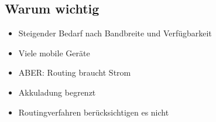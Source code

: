 \documentclass[11pt,landscape]{beamer}
\begin{document}
%
%

\subsection{Warum wichtig}

\begin{frame}{\insertsubsection}
\begin{itemize}
\item Steigender Bedarf nach Bandbreite und Verfügbarkeit\newline
\item Viele mobile Geräte\newline
\item ABER: Routing braucht Strom\newline
\item Akkuladung begrenzt\newline
\item Routingverfahren berücksichtigen es nicht
\end{itemize}
\end{frame}
\end{document}
